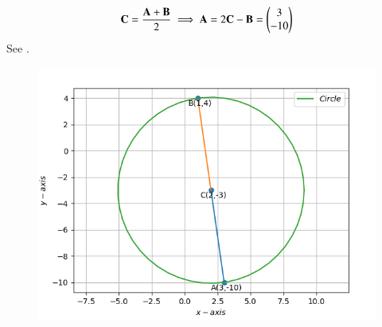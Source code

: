 	\begin{align}
	\mathbf{C} = \frac{\mathbf{A+B}}{2} 
	\implies 	\mathbf{A} = 2\mathbf{C}-\mathbf{B} 
	 = \begin{pmatrix}3\\-10\\\end{pmatrix}	
	\end{align}       
	See 
.
\begin{figure}[!h]
\begin{center}	
	\includegraphics[width=\columnwidth]{chapters/10/7/2/7/figs/Vector1.png}
\end{center}
\caption{}
\label{fig:chapters/10/7/2/7Fig}
\end{figure}
	
